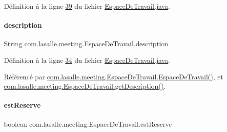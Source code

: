 Définition à la ligne \hyperlink{_espace_de_travail_8java_source_l00039}{39} du fichier \hyperlink{_espace_de_travail_8java_source}{Espace\+De\+Travail.\+java}.

\mbox{\label{classcom_1_1lasalle_1_1meeting_1_1_espace_de_travail_a4633baf86d38c201c7e288fda3604bd7}} 
\paragraph{\texorpdfstring{description}{description}}
{\footnotesize\ttfamily String com.\+lasalle.\+meeting.\+Espace\+De\+Travail.\+description\hspace{0.3cm}{\ttfamily [private]}}



Définition à la ligne \hyperlink{_espace_de_travail_8java_source_l00034}{34} du fichier \hyperlink{_espace_de_travail_8java_source}{Espace\+De\+Travail.\+java}.



Référencé par \hyperlink{_espace_de_travail_8java_source_l00070}{com.\+lasalle.\+meeting.\+Espace\+De\+Travail.\+Espace\+De\+Travail()}, et \hyperlink{_espace_de_travail_8java_source_l00097}{com.\+lasalle.\+meeting.\+Espace\+De\+Travail.\+get\+Description()}.

\mbox{\label{classcom_1_1lasalle_1_1meeting_1_1_espace_de_travail_a8913c30ae6b72ae4f35962b1ecfc496b}} 
\paragraph{\texorpdfstring{est\+Reserve}{estReserve}}
{\footnotesize\ttfamily boolean com.\+lasalle.\+meeting.\+Espace\+De\+Travail.\+est\+Reserve\hspace{0.3cm}{\ttfamily [private]}}



